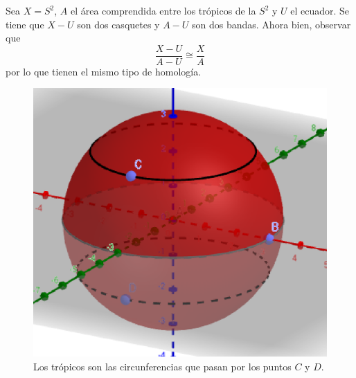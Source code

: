 \begin{ejem}
Sea $X=S^2$, $A$ el área comprendida entre los trópicos de la $S^2$ y $U$ el ecuador. Se tiene que $X-U$ son dos casquetes y $A-U$ son dos bandas. Ahora bien, observar que
$$\frac{X-U}{A-U} \cong \frac{X}{A}$$
por lo que tienen el mismo tipo de homología.

\begin{figure}[h]
\centering
\includegraphics[scale=0.5]{Figures/EsciEsfera.eps}
\caption{Los trópicos son las circunferencias que pasan por los puntos $C$ y $D$.}
\end{figure}
\end{ejem}

